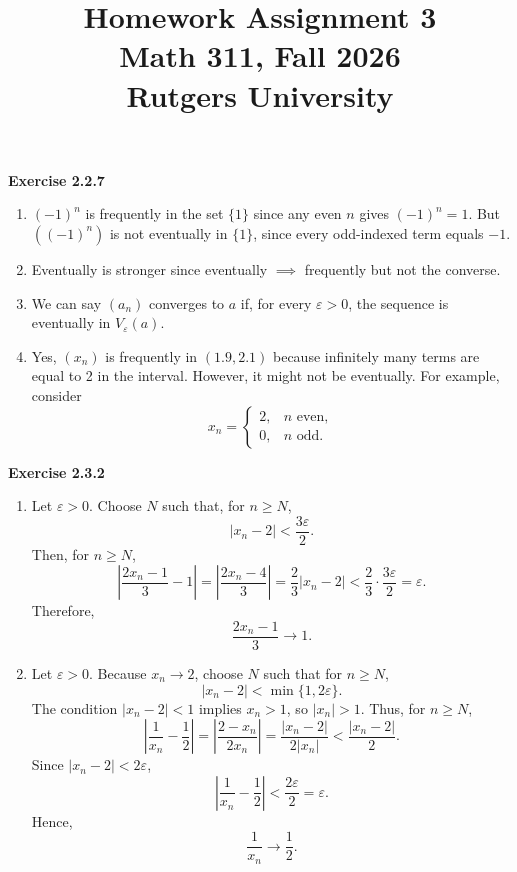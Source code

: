 \documentclass[12pt]{article}
\title{Homework Assignment 3 \\ \large Math 311, Fall 2026 \\ Rutgers University}
\author{}
\date{}
\begin{document}
\maketitle

\noindent{} \textbf{Exercise 2.2.7}
\begin{enumerate}
    \item [(a)] $(-1)^n$ is frequently in the set $\{1\}$ since any even $n$ gives $(-1)^n = 1$. But \(((-1)^n)\) is not eventually in \(\{1\}\), since every odd-indexed term equals \(-1\).
    \item [(b)] Eventually is stronger since eventually $ \implies $ frequently but not the converse.
    \item [(c)] We can say \((a_n)\) converges to \(a\) if,
          for every \(\varepsilon>0\), the sequence is eventually in \(V_\varepsilon(a)\).
    \item [(d)] Yes, $(x_n)$ is frequently in $(1.9,2.1)$ because infinitely many terms are equal to 2 in the interval.
          However, it might not be eventually. For example, consider
          \[
              x_n =
              \begin{cases}
                  2, & n \text{ even}, \\
                  0, & n \text{ odd}.
              \end{cases}
          \]
\end{enumerate}

\noindent{} \textbf{Exercise 2.3.2}
\begin{enumerate}
    \item [(a)]
          Let \(\varepsilon>0\). Choose \(N\) such that, for \(n\ge N\),
          \[
              |x_n-2|<\frac{3\varepsilon}{2}.
          \]Then, for \(n\ge N\),
          \[
              \left|\frac{2x_n-1}{3}-1\right|
              =\left|\frac{2x_n-4}{3}\right|
              =\frac{2}{3}|x_n-2|
              <\frac{2}{3}\cdot\frac{3\varepsilon}{2}
              =\varepsilon.
          \]Therefore,
          \[
              \frac{2x_n-1}{3}\to 1.
          \]
    \item [(b)]
          Let \(\varepsilon>0\). Because \(x_n\to2\), choose \(N\) such that for \(n\ge N\),
          \[
              |x_n-2|<\min\{1,2\varepsilon\}.
          \]The condition \(|x_n-2|<1\) implies \(x_n>1\), so \(|x_n|>1\). Thus, for \(n\ge N\),
          \[
              \left|\frac1{x_n}-\frac12\right|
              =
              \left|\frac{2-x_n}{2x_n}\right|
              =
              \frac{|x_n-2|}{2|x_n|}
              <
              \frac{|x_n-2|}{2}.
          \]Since \(|x_n-2|<2\varepsilon\),
          \[
              \left|\frac1{x_n}-\frac12\right|
              <
              \frac{2\varepsilon}{2}
              =
              \varepsilon.
          \]Hence,
          \[
              \frac1{x_n}\to\frac12.
          \]
\end{enumerate}
\end{document}
